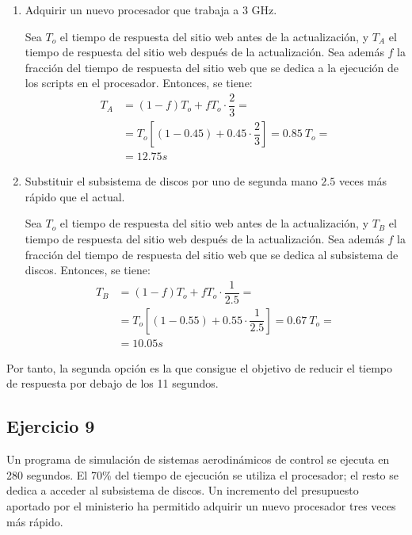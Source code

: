 \begin{enumerate}
    \item Adquirir un nuevo procesador que trabaja a 3 GHz.
    
    Sea $T_o$ el tiempo de respuesta del sitio web antes de la actualización, y $T_A$ el tiempo de respuesta del sitio web después de la actualización. Sea además $f$ la fracción del tiempo de respuesta del sitio web que se dedica a la ejecución de los scripts en el procesador. Entonces, se tiene:
    \begin{align*}
        T_A &= (1-f)T_o + fT_o\cdot \dfrac{2}{3}
        =\\&= T_o\left[(1-0.45) + 0.45\cdot \dfrac{2}{3}\right]
        = 0.85\ T_o
        =\\&= 12.75s
    \end{align*}
    \item Substituir el subsistema de discos por uno de segunda mano $2.5$ veces más rápido que el actual.
    
    Sea $T_o$ el tiempo de respuesta del sitio web antes de la actualización, y $T_B$ el tiempo de respuesta del sitio web después de la actualización. Sea además $f$ la fracción del tiempo de respuesta del sitio web que se dedica al subsistema de discos. Entonces, se tiene:
    \begin{align*}
        T_B &= (1-f)T_o + fT_o\cdot \dfrac{1}{2.5}
        =\\&= T_o\left[(1-0.55) + 0.55\cdot \dfrac{1}{2.5}\right]
        = 0.67\ T_o
        =\\&= 10.05s
    \end{align*}
\end{enumerate}

Por tanto, la segunda opción es la que consigue el objetivo de reducir el tiempo de respuesta por debajo de los 11 segundos.

\subsection*{Ejercicio 9}
Un programa de simulación de sistemas aerodinámicos de control se ejecuta en 280 segundos. El 70\% del tiempo de ejecución se utiliza el procesador; el resto se dedica a acceder al subsistema de discos. Un incremento del presupuesto aportado por el ministerio ha permitido adquirir un nuevo procesador tres veces más rápido.

